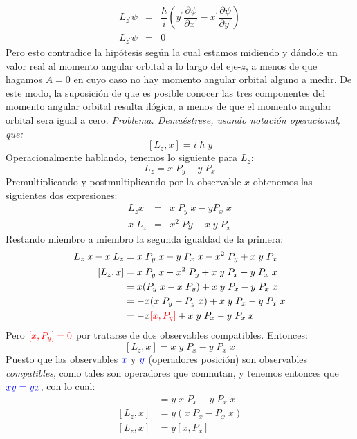 \begin{eqnarray*}
L_{z^{\prime}} \psi &=& \dfrac{\hbar}{i} \left( y^{\prime} \dfrac{\partial \psi}{\partial x^{\prime}} - x^{\prime} \dfrac{\partial \psi}{\partial y^{\prime}} \right) \nonumber \\
L_{z^{\prime}} \psi &=& 0
\end{eqnarray*}
Pero esto contradice la hipótesis según la cual estamos midiendo y dándole un valor real al momento angular orbital a lo largo del eje-$z$, a menos de que hagamos $A = 0$ en cuyo caso no hay momento angular orbital alguno a medir. De este modo, la suposición de que es posible conocer las tres componentes del momento angular orbital resulta ilógica, a menos de que el momento angular orbital sera igual a cero.
\textit{Problema. Demuéstrese, usando notación operacional, que:}
\[  [L_{z}, x] = i \; \hbar \; y \]
Operacionalmente hablando, tenemos lo siguiente para $L_{z}$:
\[ L_{z} = x \; P_{y} - y \; P_{x} \]
Premultiplicando y postmultiplicando por la observable $x$ obtenemos las siguientes dos expresiones:
\begin{eqnarray*}
L_{z}x &=& x \; P_{y} \; x - y P_{x} \; x \nonumber \\
x \; L_{z}  &=& x^{2} \;Py - x \;y \; P_{x} \nonumber
\end{eqnarray*} 
Restando miembro a miembro la segunda igualdad de la primera:
\begin{eqnarray}
L_{z} \; x - x \; L_{z} &= x \; P_{y} \; x - y \; P_{x} \; x - x^{2} \; P_{y}  + x \; y \; P_{x} \nonumber \\
[L_{z}, x] &= x\; P_{y} \; x - x^{2} \; P_{y} + x \;y \; P_{x} - y \; P_{x} \;x \nonumber \\
&= x(P_{y} \; x - x \; P_{y}) + x \; y \; P_{x} - y \; P_{x} \; x \nonumber \\
&= - x(x \; P_{y} - P_{y} \; x) + x \; y \; P_{x} - y \; P_{x} \; x \nonumber \\
&= - x {\color{red}{[x, P_{y}]}} + x \; y \; P_{x} - y \; P_{x} \;x \nonumber
\end{eqnarray}
Pero $\color{red}{[x, P_{y}]} = 0$ por tratarse de dos observables compatibles. Entonces:
\[ [L_{z},x] = x \; y \; P_{x} - y \; P_{x} \; x \]
Puesto que las observables $\color{blue}{x}$ y $\color{blue}{y}$ (operadores posición) son observables \emph{compatibles}, como tales son operadores que conmutan, y tenemos entonces que $\color{blue}{x y = y x}$, con lo cual:
\begin{eqnarray*}
[L_{z}, x] &= y \; x \; P_{x} - y \; P_{x} \; x \nonumber \\
[L_{z}, x] &= y(x \; P_{x}  - P_{x} \; x) \nonumber \\
[L_{z}, x] &= y[x, P_{x}]
\end{eqnarray*}
